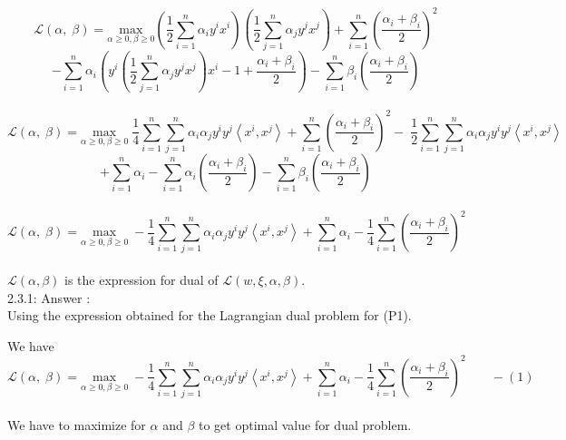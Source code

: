 \documentclass[a4paper,11pt]{article}
\begin{document}
\begin{mlsolution}
\[
  \mathcal{L}\left ( \alpha,\; \beta  \right ) = \underset{\alpha\geq 0, \beta \geq 0 }{\text{max}} \left ( \frac{1}{2}\sum_{i=1}^{n} \alpha_{i}y^{i}x^{i}  \right )\left ( \frac{1}{2}\sum_{j=1}^{n} \alpha_{j}y^{j}x^{j} \right ) + \sum_{i=1}^{n} \left ( \frac{\alpha_{i} + \beta_{i}}{2} \right )^{2}  \]\[ - \sum_{i=1}^{n} \alpha_{i}\left ( y^{i}\left ( \frac{1}{2}\sum_{j=1}^{n} \alpha_{j}y^{j}x^{j}  \right )x^{i} - 1  +  \frac{\alpha_{i} + \beta_{i}}{2} \right ) - \sum_{i=1}^{n} \beta_{i} \left ( \frac{\alpha_{i} + \beta_{i}}{2}  \right )
\]\\

\[
  \mathcal{L}\left ( \alpha,\; \beta  \right ) = \underset{\alpha\geq 0, \beta \geq 0 }{\text{max}} \; \frac{1}{4}\sum_{i=1}^{n}\sum_{j=1}^{n}\alpha_{i}\alpha_{j}y^{i}y^{j}\left \langle x^{i}, x^{j} \right \rangle+ \sum_{i=1}^{n} \left ( \frac{\alpha_{i} + \beta_{i}}{2} \right )^{2} -\; \frac{1}{2}\sum_{i=1}^{n}\sum_{j=1}^{n}\alpha_{i}\alpha_{j}y^{i}y^{j}\left \langle x^{i}, x^{j} \right \rangle \]\[ + \sum_{i=1}^{n}\alpha_{i} - \sum_{i=1}^{n} \alpha_{i} \left ( \frac{\alpha_{i} + \beta_{i}}{2}  \right ) - \sum_{i=1}^{n} \beta_{i} \left ( \frac{\alpha_{i} + \beta_{i}}{2}  \right )
\]\\

\[
  \mathcal{L}\left ( \alpha,\; \beta  \right ) = \underset{\alpha\geq 0, \beta \geq 0 }{\text{max}} \; -\frac{1}{4}\sum_{i=1}^{n}\sum_{j=1}^{n}\alpha_{i}\alpha_{j}y^{i}y^{j}\left \langle x^{i}, x^{j} \right \rangle+ \sum_{i=1}^{n}\alpha_{i} - \frac{1}{4}\sum_{i=1}^{n} \left ( \frac{\alpha_{i} + \beta_{i}}{2} \right )^{2}
\]\\

$\mathcal{L}(\alpha, \beta)$ is the expression for dual of $\mathcal{L}(w, \xi, \alpha, \beta)$.\\

2.3.1: Answer : \\

Using the expression obtained for the Lagrangian dual problem for (P1).

We have 
\[
  \mathcal{L}\left ( \alpha,\; \beta  \right ) = \underset{\alpha\geq 0, \beta \geq 0 }{\text{max}} \; -\frac{1}{4}\sum_{i=1}^{n}\sum_{j=1}^{n}\alpha_{i}\alpha_{j}y^{i}y^{j}\left \langle x^{i}, x^{j} \right \rangle+ \sum_{i=1}^{n}\alpha_{i} - \frac{1}{4}\sum_{i=1}^{n} \left ( \frac{\alpha_{i} + \beta_{i}}{2} \right )^{2} \;\;\;\;\;\;\; - (1)
\]\\

We have to maximize for $\alpha$ and $\beta$ to get optimal value for dual problem.


\end{mlsolution}
\end{document}
